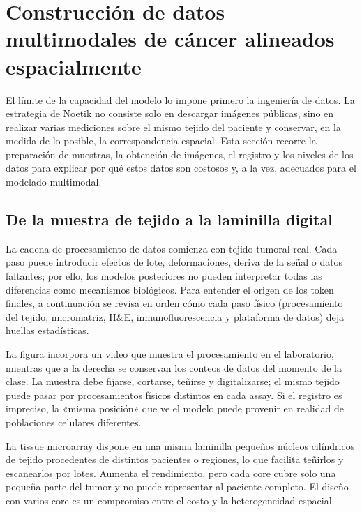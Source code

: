 \section{Construcción de datos multimodales de cáncer alineados espacialmente}

El límite de la capacidad del modelo lo impone primero la ingeniería de datos. La estrategia de Noetik no consiste solo en descargar imágenes públicas, sino en realizar varias mediciones sobre el mismo tejido del paciente y conservar, en la medida de lo posible, la correspondencia espacial. Esta sección recorre la preparación de muestras, la obtención de imágenes, el registro y los niveles de los datos para explicar por qué estos datos son costosos y, a la vez, adecuados para el modelado multimodal.

\subsection{De la muestra de tejido a la laminilla digital}

La cadena de procesamiento de datos comienza con tejido tumoral real. Cada paso puede introducir efectos de lote, deformaciones, deriva de la señal o datos faltantes; por ello, los modelos posteriores no pueden interpretar todas las diferencias como mecanismos biológicos. Para entender el origen de los token finales, a continuación se revisa en orden cómo cada paso físico (procesamiento del tejido, micromatriz, H\&E, inmunofluorescencia y plataforma de datos) deja huellas estadísticas.


La figura incorpora un video que muestra el procesamiento en el laboratorio, mientras que a la derecha se conservan los conteos de datos del momento de la clase. La muestra debe fijarse, cortarse, teñirse y digitalizarse; el mismo tejido puede pasar por procesamientos físicos distintos en cada assay. Si el registro es impreciso, la «misma posición» que ve el modelo puede provenir en realidad de poblaciones celulares diferentes.


La tissue microarray dispone en una misma laminilla pequeños núcleos cilíndricos de tejido procedentes de distintos pacientes o regiones, lo que facilita teñirlos y escanearlos por lotes. Aumenta el rendimiento, pero cada core cubre solo una pequeña parte del tumor y no puede representar al paciente completo. El diseño con varios core es un compromiso entre el costo y la heterogeneidad espacial.

